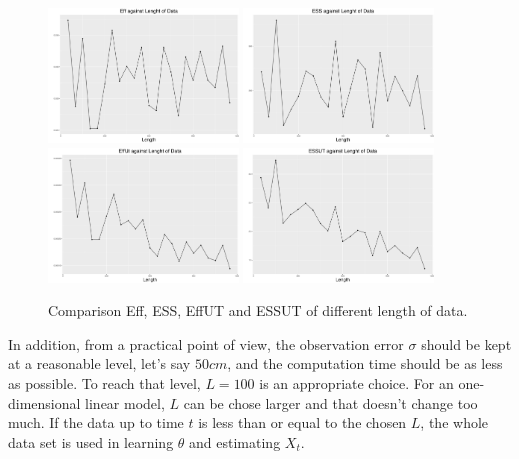 \begin{figure}[h]
\centering
\includegraphics[width=0.45\textwidth]{Chapters/05MCMCOU/plots/simudataOUlengtheff.pdf}
\includegraphics[width=0.45\textwidth]{Chapters/05MCMCOU/plots/simudataOUlengthess.pdf}
\includegraphics[width=0.45\textwidth]{Chapters/05MCMCOU/plots/simudataOUlengtheffut.pdf}
\includegraphics[width=0.45\textwidth]{Chapters/05MCMCOU/plots/simudataOUlengthessut.pdf}
\caption{Comparison Eff, ESS, EffUT and ESSUT of different length of data. }\label{compareLengthData}
\end{figure}
In addition, from a practical point of view, the observation error $\sigma$ should be kept at a reasonable level, let's say $50cm$, and the computation time should be as less as possible. To reach that level, $L=100$ is an appropriate choice. For an one-dimensional linear model, $L$ can be chose larger and that doesn't change too much. If the data up to time $t$ is less than or equal to the chosen $L$, the whole data set is used in learning $\theta$ and estimating $X_t$. 

